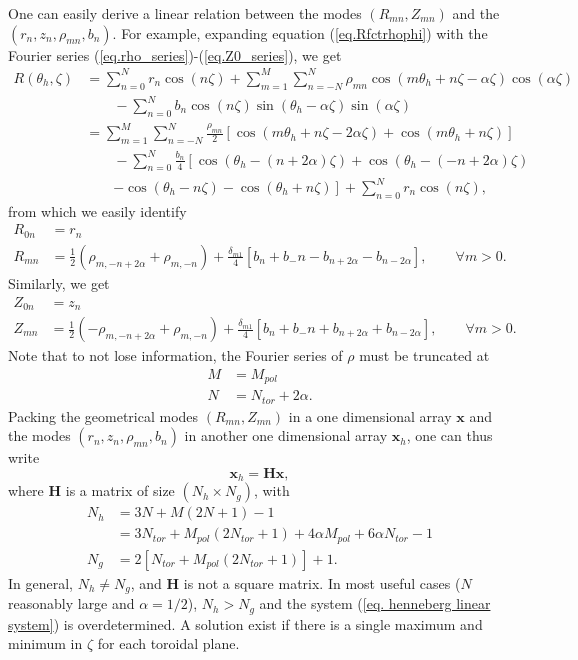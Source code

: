 \documentclass[my_thesis.tex]{subfiles}
\begin{document}
One can easily derive a linear relation between the modes $(R_{mn},Z_{mn})$ and the $(r_n,z_n,\rho_{mn},b_n)$. For example, expanding equation (\ref{eq.Rfctrhophi}) with the Fourier series (\ref{eq.rho_series})-(\ref{eq.Z0_series}), we get
\begin{align}
	R(\theta_h,\zeta) &= \sum_{n=0}^Nr_n \cos(n \zeta) + \sum_{m=1}^{M}\sum_{n=-N}^N \rho_{mn}\cos(m\theta_h +n\zeta -\alpha \zeta)\cos(\alpha \zeta)\\
	&\qquad - \sum_{n=0}^N b_n\cos(n\zeta)\sin(\theta_h-\alpha \zeta)\sin(\alpha \zeta)\\
	&=\sum_{m=1}^{M}\sum_{n=-N}^N \frac{\rho_{mn}}{2}\left[\cos(m\theta_h +n\zeta -2\alpha \zeta)+\cos(m\theta_h+n\zeta)\right]\\
	&\qquad- \sum_{n=0}^N \frac{b_n}{4}\left[\cos(\theta_h-(n+2\alpha)\zeta)+\cos(\theta_h-(-n+2\alpha)\zeta)\right.\\
	&\qquad\left.-\cos(\theta_h-n\zeta)-\cos(\theta_h+n\zeta)\right] +  \sum_{n=0}^Nr_n \cos(n \zeta),
\end{align}
from which we easily identify
\begin{align}
	R_{0n} &= r_n\\
	R_{mn} &= \frac{1}{2}(\rho_{m,-n+2\alpha}+\rho_{m,-n}) + \frac{\delta_{m1}}{4}\left[b_n+b_-n-b_{n+2\alpha}-b_{n-2\alpha}\right], \qquad \forall m>0. \label{eq, linear relation Rmn}
\end{align}
Similarly, we get
\begin{align}
	Z_{0n} &= z_n\\
	Z_{mn} &= \frac{1}{2}(-\rho_{m,-n+2\alpha}+\rho_{m,-n}) + \frac{\delta_{m1}}{4}\left[b_n+b_-n+b_{n+2\alpha}+b_{n-2\alpha}\right], \qquad \forall m>0.	\label{eq, linear relation Zmn}
\end{align}
Note that to not lose information, the Fourier series of $\rho$ must be truncated at 
\begin{align}
M&=M_{pol} \label{eq.truncation rho mpol}\\
N&=N_{tor}+2\alpha. \label{eq.truncation rho ntor}
\end{align}
Packing the geometrical modes $(R_{mn},Z_{mn})$ in a one dimensional array $\mathbf{x}$ and the modes $(r_n,z_n,\rho_{mn},b_n)$ in another one dimensional array $\mathbf{x}_h$, one can thus write
\begin{equation}
	\mathbf{x}_h = \mathbf{H}\mathbf{x}, \label{eq. henneberg linear system}
\end{equation}
where $\mathbf{H}$ is a matrix of size $(N_h\times N_g)$, with
\begin{align}
	N_h &= 3N + M(2N+1) -1 \\
	&= 3N_{tor} + M_{pol}(2N_{tor}+1) + 4\alpha M_{pol} + 6\alpha N_{tor} -1\\
	N_g & = 2[N_{tor}+M_{pol}(2N_{tor}+1)]+1.
\end{align}
In general, $N_h \neq N_g$, and $\mathbf{H}$ is not a square matrix. In most useful cases ($N$ reasonably large and $\alpha=1/2$), $N_h>N_g$ and the system (\ref{eq. henneberg linear system}) is overdetermined. A solution exist if there is a single maximum and minimum in $\zeta$ for each toroidal plane.
\end{document}
